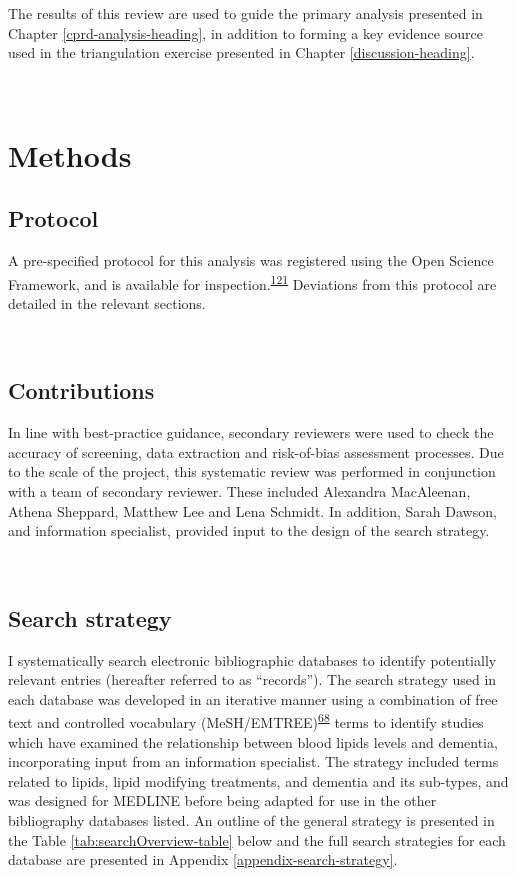 \documentclass[a4paper, twoside]{templates/ociamthesis}
\begin{document}
The results of this review are used to guide the primary analysis presented in Chapter \ref{cprd-analysis-heading}, in addition to forming a key evidence source used in the triangulation exercise presented in Chapter \ref{discussion-heading}.

~

\hypertarget{methods}{%
\section{Methods}\label{methods}}

\hypertarget{protocol}{%
\subsection{Protocol}\label{protocol}}

A pre-specified protocol for this analysis was registered using the Open Science Framework, and is available for inspection.\textsuperscript{\protect\hyperlink{ref-mcguinnessluke2020}{121}} Deviations from this protocol are detailed in the relevant sections.

~

\hypertarget{contributions}{%
\subsection{Contributions}\label{contributions}}

In line with best-practice guidance, secondary reviewers were used to check the accuracy of screening, data extraction and risk-of-bias assessment processes. Due to the scale of the project, this systematic review was performed in conjunction with a team of secondary reviewer. These included Alexandra MacAleenan, Athena Sheppard, Matthew Lee and Lena Schmidt. In addition, Sarah Dawson, and information specialist, provided input to the design of the search strategy.

~

\hypertarget{search-strategy}{%
\subsection{Search strategy}\label{search-strategy}}

I systematically search electronic bibliographic databases to identify potentially relevant entries (hereafter referred to as ``records''). The search strategy used in each database was developed in an iterative manner using a combination of free text and controlled vocabulary (MeSH/EMTREE)\textsuperscript{\protect\hyperlink{ref-lefebvre2019searching}{68}} terms to identify studies which have examined the relationship between blood lipids levels and dementia, incorporating input from an information specialist. The strategy included terms related to lipids, lipid modifying treatments, and dementia and its sub-types, and was designed for MEDLINE before being adapted for use in the other bibliography databases listed. An outline of the general strategy is presented in the Table \ref{tab:searchOverview-table} below and the full search strategies for each database are presented in Appendix \ref{appendix-search-strategy}.
\end{document}
